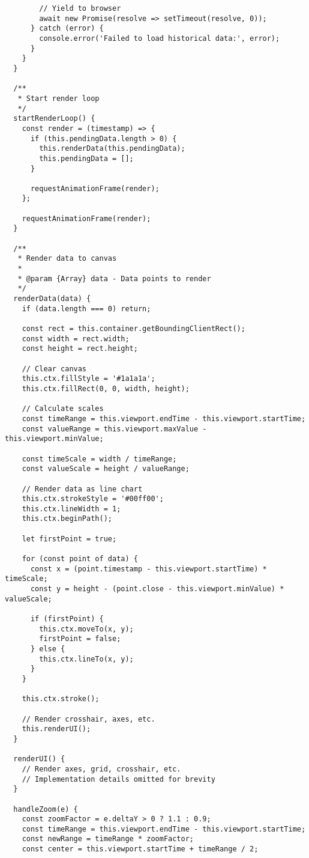 \documentclass[11pt]{article}
\begin{document}
\begin{verbatim}
        // Yield to browser
        await new Promise(resolve => setTimeout(resolve, 0));
      } catch (error) {
        console.error('Failed to load historical data:', error);
      }
    }
  }
  
  /**
   * Start render loop
   */
  startRenderLoop() {
    const render = (timestamp) => {
      if (this.pendingData.length > 0) {
        this.renderData(this.pendingData);
        this.pendingData = [];
      }
      
      requestAnimationFrame(render);
    };
    
    requestAnimationFrame(render);
  }
  
  /**
   * Render data to canvas
   * 
   * @param {Array} data - Data points to render
   */
  renderData(data) {
    if (data.length === 0) return;
    
    const rect = this.container.getBoundingClientRect();
    const width = rect.width;
    const height = rect.height;
    
    // Clear canvas
    this.ctx.fillStyle = '#1a1a1a';
    this.ctx.fillRect(0, 0, width, height);
    
    // Calculate scales
    const timeRange = this.viewport.endTime - this.viewport.startTime;
    const valueRange = this.viewport.maxValue - this.viewport.minValue;
    
    const timeScale = width / timeRange;
    const valueScale = height / valueRange;
    
    // Render data as line chart
    this.ctx.strokeStyle = '#00ff00';
    this.ctx.lineWidth = 1;
    this.ctx.beginPath();
    
    let firstPoint = true;
    
    for (const point of data) {
      const x = (point.timestamp - this.viewport.startTime) * timeScale;
      const y = height - (point.close - this.viewport.minValue) * valueScale;
      
      if (firstPoint) {
        this.ctx.moveTo(x, y);
        firstPoint = false;
      } else {
        this.ctx.lineTo(x, y);
      }
    }
    
    this.ctx.stroke();
    
    // Render crosshair, axes, etc.
    this.renderUI();
  }
  
  renderUI() {
    // Render axes, grid, crosshair, etc.
    // Implementation details omitted for brevity
  }
  
  handleZoom(e) {
    const zoomFactor = e.deltaY > 0 ? 1.1 : 0.9;
    const timeRange = this.viewport.endTime - this.viewport.startTime;
    const newRange = timeRange * zoomFactor;
    const center = this.viewport.startTime + timeRange / 2;
    

\end{verbatim}
\end{document}
